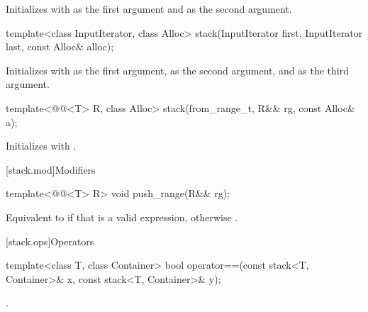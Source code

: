 \begin{itemdescr}
\pnum
\effects
Initializes  with  as the first argument and 
as the second argument.
\end{itemdescr}

%
\begin{itemdecl}
template<class InputIterator, class Alloc>
  stack(InputIterator first, InputIterator last, const Alloc& alloc);
\end{itemdecl}

\begin{itemdescr}
\pnum
\effects
Initializes  with
 as the first argument,
 as the second argument, and
 as the third argument.
\end{itemdescr}

%
\begin{itemdecl}
template<@@<T> R, class Alloc>
  stack(from_range_t, R&& rg, const Alloc& a);
\end{itemdecl}

\begin{itemdescr}
\pnum
\effects
Initializes
 with .
\end{itemdescr}

[stack.mod]{Modifiers}

%
\begin{itemdecl}
template<@@<T> R>
  void push_range(R&& rg);
\end{itemdecl}

\begin{itemdescr}
\pnum
\effects
Equivalent to 
if that is a valid expression,
otherwise .
\end{itemdescr}

[stack.ops]{Operators}

%
\begin{itemdecl}
template<class T, class Container>
  bool operator==(const stack<T, Container>& x, const stack<T, Container>& y);
\end{itemdecl}

\begin{itemdescr}
\pnum
\returns
{}.
\end{itemdescr}

